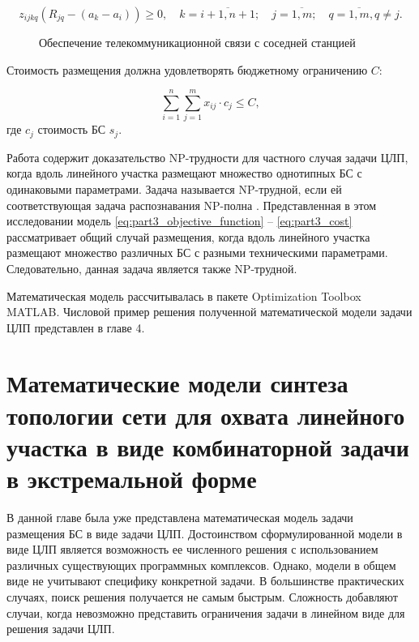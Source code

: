 \begin{equation}
  \label{eq:part3_z_ijkq_4}
  z_{ijkq} (R_{jq}-(a_k-a_i )) \geq 0, \quad k=\overline{i+1,n+1}; \quad j=\overline{1,m}; \quad q= \overline{1,m}, q \neq j.
\end{equation}

\begin{figure}[ht]
  \caption{Обеспечение телекоммуникационной связи с соседней станцией}\label{fig:part3_station_link_between_points}
\end{figure}

Стоимость размещения должна удовлетворять бюджетному ограничению $C$:

\begin{equation}
  \label{eq:part3_cost}
  \sum\limits_{i=1}^n \sum\limits_{j=1}^m x_{ij} \cdot c_j \leq C,
\end{equation}
где $c_j$ стоимость БС $s_j$.

Работа \cite{Ivanov2018} содержит доказательство NP-трудности для частного случая задачи ЦЛП, когда вдоль линейного участка размещают множество однотипных БС с одинаковыми параметрами. Задача называется NP-трудной, если ей соответствующая задача распознавания NP-полна \cite{Pershin2013}.  Представленная в этом исследовании модель \cref{eq:part3_objective_function} -- \cref{eq:part3_cost} рассматривает общий случай размещения, когда вдоль линейного участка размещают множество различных БС с разными техническими параметрами. Следовательно, данная задача является также NP-трудной.

Математическая модель рассчитывалась в пакете Optimization Toolbox MATLAB. Числовой пример решения полученной математической модели задачи ЦЛП представлен в главе 4.


\section{Математические модели синтеза топологии сети для охвата линейного участка в виде комбинаторной задачи в экстремальной форме}

В данной главе была уже представлена математическая модель задачи размещения БС в виде задачи ЦЛП. Достоинством сформулированной модели в виде ЦЛП является возможность ее численного решения с использованием различных существующих программных комплексов. Однако, модели в общем виде не учитывают специфику конкретной задачи. В большинстве практических случаях, поиск решения получается не самым быстрым. Сложность добавляют случаи, когда невозможно представить ограничения задачи в линейном виде для решения задачи ЦЛП. 


